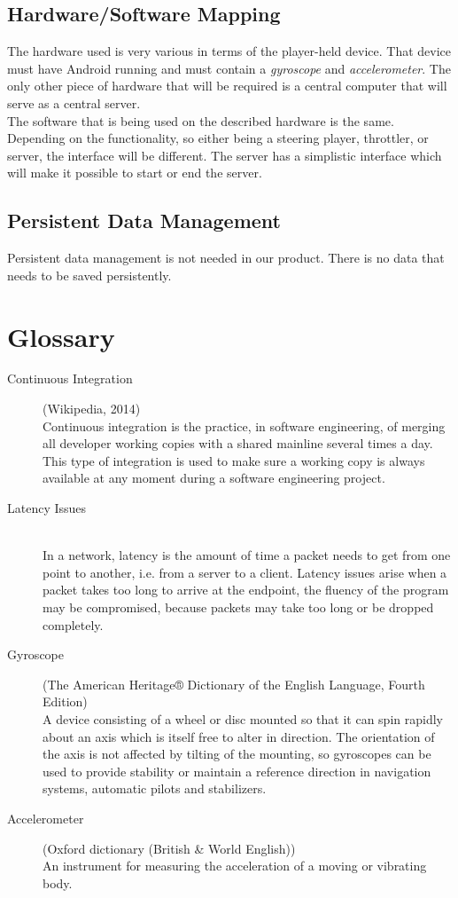 \documentclass[11pt,twoside,a4paper]{article}
\begin{document}
\subsection{Hardware/Software Mapping}
The hardware used is very various in terms of the player-held device. That device must have Android running and must contain a \emph{gyroscope} and \emph{accelerometer}. The only other piece of hardware that will be required is a central computer that will serve as a central server. \\
The software that is being used on the described hardware is the same. Depending on the functionality, so either being a steering player, throttler, or server, the interface will be different. The server has a simplistic interface which will make it possible to start or end the server.


\subsection{Persistent Data Management}
Persistent data management is not needed in our product. There is no data that needs to be saved persistently.

\newpage


\section{Glossary}
\begin{description}
\item[Continuous Integration] (Wikipedia, 2014) \hfill \\
Continuous integration is the practice, in software engineering, of merging all developer working copies with a shared mainline several times a day. This type of integration is used to make sure a working copy is always available at any moment during a software engineering project.
\item[Latency Issues] \hfill \\
In a network, latency is the amount of time a packet needs to get from one point to another, i.e. from a server to a client. Latency issues arise when a packet takes too long to arrive at the endpoint, the fluency of the program may be compromised, because packets may take too long or be dropped completely. 
\item[Gyroscope] (The American Heritage® Dictionary of the English Language, Fourth Edition)\hfill \\
A device consisting of a wheel or disc mounted so that it can spin rapidly about an axis which is itself free to alter in direction. The orientation of the axis is not affected by tilting of the mounting, so gyroscopes can be used to provide stability or maintain a reference direction in navigation systems, automatic pilots and stabilizers.
\item[Accelerometer] (Oxford dictionary (British \& World English)) \hfill \\
An instrument for measuring the acceleration of a moving or vibrating body.
\end{description}
\end{document}
